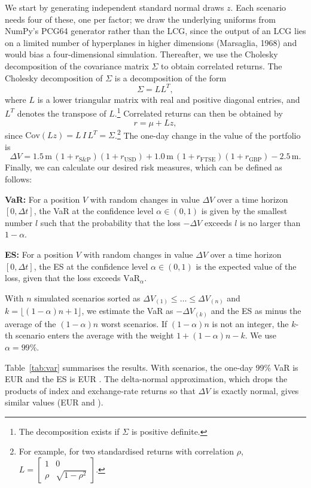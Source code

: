 \documentclass[12pt,a4paper]{article}
\begin{document}
We start by generating independent standard normal draws $z$. Each scenario needs four of these, one per factor; we draw the underlying uniforms from NumPy's PCG64 generator rather than the LCG, since the output of an LCG lies on a limited number of hyperplanes in higher dimensions (Marsaglia, 1968) and would bias a four-dimensional simulation. Thereafter, we use the Cholesky decomposition of the covariance matrix $\Sigma$ to obtain correlated returns. The Cholesky decomposition of $\Sigma$ is a decomposition of the form
\[
\Sigma = L L^{T},
\]
where $L$ is a lower triangular matrix with real and positive diagonal entries, and $L^{T}$ denotes the transpose of $L$.\footnote{The decomposition exists if $\Sigma$ is positive definite.} Correlated returns can then be obtained by
\[
r = \mu + L z,
\]
since $\mathrm{Cov}(Lz) = L\,I\,L^{T} = \Sigma$.\footnote{For example, for two standardised returns with correlation $\rho$, $L = \begin{bmatrix} 1 & 0 \\ \rho & \sqrt{1-\rho^2}\end{bmatrix}$.} The one-day change in the value of the portfolio is
\[
\Delta V = 1.5\,\text{m}\,(1 + r_{\text{S\&P}})(1 + r_{\text{USD}}) + 1.0\,\text{m}\,(1 + r_{\text{FTSE}})(1 + r_{\text{GBP}}) - 2.5\,\text{m}.
\]
Finally, we can calculate our desired risk measures, which can be defined as follows:

\textbf{VaR:} For a position $V$ with random changes in value $\Delta V$ over a time horizon $[0, \Delta t]$, the VaR at the confidence level $\alpha \in (0,1)$ is given by the smallest number $l$ such that the probability that the loss $-\Delta V$ exceeds $l$ is no larger than $1 - \alpha$.

\textbf{ES:} For a position $V$ with random changes in value $\Delta V$ over a time horizon $[0, \Delta t]$, the ES at the confidence level $\alpha \in (0,1)$ is the expected value of the loss, given that the loss exceeds $\text{VaR}_\alpha$.

With $n$ simulated scenarios sorted as $\Delta V_{(1)} \le \dots \le \Delta V_{(n)}$ and $k = \lfloor (1-\alpha) n + 1 \rfloor$, we estimate the VaR as $-\Delta V_{(k)}$ and the ES as minus the average of the $(1-\alpha)n$ worst scenarios. If $(1-\alpha)n$ is not an integer, the $k$-th scenario enters the average with the weight $1 + (1-\alpha)n - k$. We use $\alpha = 99\%$.

Table~\ref{tab:var} summarises the results. With \RefDraws{} scenarios, the one-day 99\% VaR is EUR \VaRRef{} and the ES is EUR \ESRef. The delta-normal approximation, which drops the products of index and exchange-rate returns so that $\Delta V$ is exactly normal, gives similar values (EUR \VaRDN{} and \ESDN).
\end{document}

